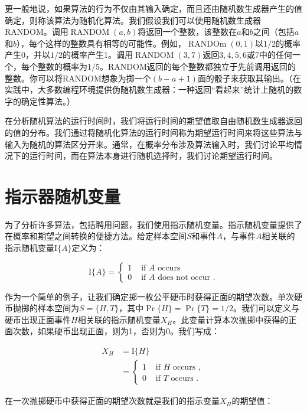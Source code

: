 \documentclass[lang=cn,newtx,10pt,scheme=chinese]{elegantbook}
\begin{document}
更一般地说，如果算法的行为不仅由其输入确定，而且还由随机数生成器产生的值确定，则称该算法为随机化算法。我们假设我们可以使用随机数生成器RANDOM。调用$\operatorname{RANDOM}(a,b)$将返回一个整数，该整数在$a$和$b$之间（包括$a$和$b$），每个这样的整数具有相等的可能性。例如，$\operatorname{RANDOm}(0,1)$以$1/2$的概率产生0，并以$1/2$的概率产生1。调用$\operatorname{RANDOM}(3,7)$返回$3,4,5,6$或7中的任何一个，每个整数的概率为$1/5$。RANDOM返回的每个整数都独立于先前调用返回的整数。你可以将RANDOM想象为掷一个$(b-a+1)$面的骰子来获取其输出。（在实践中，大多数编程环境提供伪随机数生成器：一种返回“看起来”统计上随机的数字的确定性算法。）

在分析随机算法的运行时间时，我们将运行时间的期望值取自由随机数生成器返回的值的分布。我们通过将随机化算法的运行时间称为期望运行时间来将这些算法与输入为随机的算法区分开来。通常，在概率分布涉及算法输入时，我们讨论平均情况下的运行时间，而在算法本身进行随机选择时，我们讨论期望运行时间。

\section{指示器随机变量}\label{section-5.2}

为了分析许多算法，包括聘用问题，我们使用指示随机变量。指示随机变量提供了在概率和期望之间转换的便捷方法。给定样本空间$S$和事件$A$，与事件$A$相关联的指示随机变量$\mathrm{I}\{A\}$定义为：

$$
\mathrm{I}\{A\}= \begin{cases}1 & \text { if } A \text { occurs } \\ 0 & \text { if } A \text { does not occur } .\end{cases}
$$

作为一个简单的例子，让我们确定掷一枚公平硬币时获得正面的期望次数。单次硬币抛掷的样本空间为$S=\{H, T\}$，其中$\operatorname{Pr}\{H\}=\operatorname{Pr}\{T\}=1 / 2$。我们可以定义与硬币出现正面事件$H$相关联的指示随机变量$X_H$。此变量计算本次抛掷中获得的正面次数，如果硬币出现正面，则为1，否则为0。我们写成：

$$
\begin{aligned}
X_H & =\mathrm{I}\{H\} \\
& = \begin{cases}1 & \text { if } H \text { occurs }, \\
0 & \text { if } T \text { occurs } .\end{cases}
\end{aligned}
$$

在一次抛掷硬币中获得正面的期望次数就是我们的指示变量$X_H$的期望值：
\end{document}

